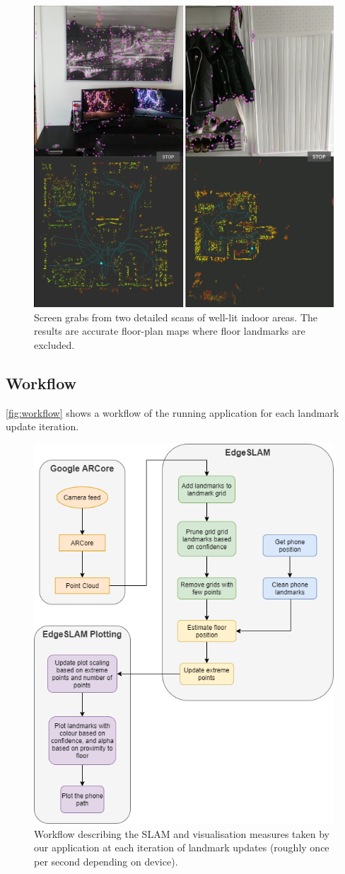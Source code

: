 \documentclass{article}
\begin{document}
\begin{figure}[!htb]
    \centering
    \includegraphics[width=0.6\linewidth]{scan-example.png}
    \caption{Screen grabs from two detailed scans of well-lit indoor areas. The results are accurate floor-plan maps where floor landmarks are excluded.}
    \label{fig:scan-example}
\end{figure}

\newpage
\subsection{Workflow} \label{workflow}
\autoref{fig:workflow} shows a workflow of the running application for each landmark update iteration.
\begin{figure}[!htb]
    \centering
    \includegraphics[width=0.9\linewidth]{EdgeSLAM Workflow Diagran.png}
    \caption{Workflow describing the SLAM and visualisation measures taken by our application at each iteration of landmark updates (roughly once per second depending on device).}
    \label{fig:workflow}
\end{figure}
\end{document}
